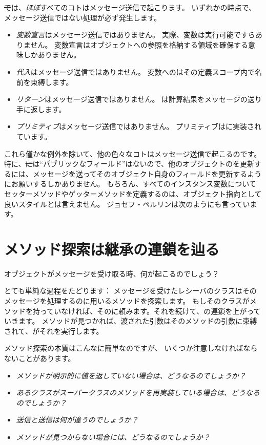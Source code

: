 \documentclass[a4paper,10pt,twoside]{book}
\begin{document}
\st では、\emph{ほぼ}すべてのコトはメッセージ送信で起こります。
いずれかの時点で、メッセージ送信ではない処理が必ず発生します。
\begin{itemize}
  \item \emph{変数宣言}はメッセージ送信ではありません。
		実際、変数は実行可能ですらありません。
		変数宣言はオブジェクトへの参照を格納する領域を確保する意味しかありません。
  \item \emph{代入}はメッセージ送信ではありません。
		変数へのはその定義スコープ内で名前を束縛します。
  \item \emph{リターン}はメッセージ送信ではありません。
		は計算結果をメッセージの送り手に返します。
  \item \emph{プリミティブ}はメッセージ送信ではありません。
		プリミティブはに実装されています。
\end{itemize}
これら僅かな例外を除いて、他の色々なコトはメッセージ送信で起こるのです。
特に、\st には``パブリックなフィールド''はないので、他のオブジェクトのを更新するには、メッセージを送ってそのオブジェクト自身のフィールドを更新するようにお願いするしかありません。
もちろん、すべてのインスタンス変数についてセッターメソッドやゲッターメソッドを定義するのは、オブジェクト指向として良いスタイルとは言えません。
ジョセフ・ペルリンは次のようにも言っています。

\section{メソッド探索は継承の連鎖を辿る}


オブジェクトがメッセージを受け取る時、何が起こるのでしょう？

とても単純な過程をたどります：
メッセージを受けたレシーバのクラスはそのメッセージを処理するのに用いるメソッドを探索します。
もしそのクラスがメソッドを持っていなければ、そのに頼みます。それを続けて、の連鎖を上がっていきます。
メソッドが見つかれば、渡された引数はそのメソッドの引数に束縛されて、がそれを実行します。

メソッド探索の本質はこんなに簡単なのですが、
いくつか注意しなければならないことがあります。

\begin{itemize}
  \item \emph{メソッドが明示的に値を返していない場合は、どうなるのでしょうか？}
  \item \emph{あるクラスがスーパークラスのメソッドを再実装している場合は、どうなるのでしょうか？}
  \item \emph{送信と送信は何が違うのでしょうか？}
  \item \emph{メソッドが見つからない場合には、どうなるのでしょうか？}
\end{itemize}
\end{document}
